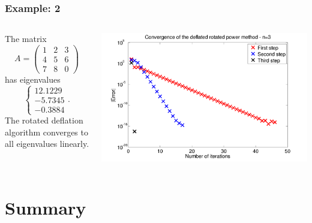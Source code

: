 \documentclass{beamer}
\begin{document}
\begin{frame}
  \frametitle{Example: 2}


  \begin{columns}
    \begin{column}{0.35\textwidth}
      The matrix
      \begin{equation*}
        A =
        \begin{pmatrix}
          1 & 2 & 3 \\
          4 & 5 & 6 \\
          7 & 8 & 0
        \end{pmatrix}
      \end{equation*}
      has eigenvalues
      \begin{equation*}
        \left\{
          \begin{array}{c}
            12.1229\\ -5.7345\\ -0.3884
          \end{array}\right. .
      \end{equation*}
      The rotated deflation algorithm converges to all eigenvalues linearly.
    \end{column}
    \begin{column}{0.65\textwidth}
      \includegraphics[width=\textwidth]{figures/RotationDeflation1}
    \end{column}
  \end{columns}


\end{frame}

\section{Summary}
\end{document}
